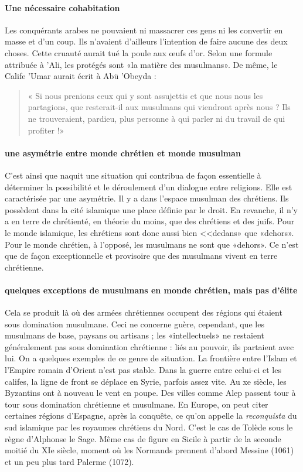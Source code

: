 \paragraph{Une nécessaire cohabitation}Les conquérants arabes ne pouvaient ni massacrer ces gens ni les convertir en masse et d'un coup. Ils n'avaient d'ailleurs l'intention de faire aucune des deux choses. Cette cruauté aurait tué la poule aux œufs d'or. Selon une formule attribuée à 'Ali, les protégés sont «la matière des musulmans». De même, le Calife 'Umar aurait écrit à Abü 'Obeyda : \begin{quote}
    « Si nous prenions ceux qui y sont assujettis et que nous nous les partagions, que resterait-il aux musulmans qui viendront après nous ? Ils ne trouveraient, pardieu, plus personne à qui parler ni du travail de qui profiter !»
\end{quote} 

\paragraph{une asymétrie entre monde chrétien et monde musulman}
C'est ainsi que naquit une situation qui contribua de façon essentielle à déterminer la possibilité et le déroulement d'un dialogue entre religions. Elle est caractérisée par une asymétrie. Il y a dans l'espace musulman des chrétiens. Ils possèdent dans la cité islamique une place définie par le droit. En revanche, il n'y a en
terre de chrétienté, en théorie du moins, que des chrétiens et des juifs. Pour le monde islamique, les chrétiens sont donc aussi bien
<<dedans» que «dehors». Pour le monde chrétien, à l'opposé, les musulmans ne sont que «dehors». Ce n'est que de façon exceptionnelle et provisoire que des musulmans vivent en terre chrétienne.

\paragraph{quelques exceptions de musulmans en monde chrétien, mais pas d'élite}
Cela se produit là où des armées chrétiennes occupent des régions qui étaient sous domination musulmane. Ceci ne concerne guère, cependant, que les musulmans de base, paysans ou artisans ; les «intellectuels» ne restaient généralement pas sous domination chrétienne : liés au pouvoir, ils partaient avec lui. On a quelques exemples de ce genre de situation. La frontière entre l'Islam et l'Empire romain d'Orient n'est pas stable. Dans la guerre entre celui-ci et les califes, la ligne de front se déplace en Syrie, parfois assez vite. Au xe siècle, les Byzantins ont à nouveau le vent en poupe. Des villes comme Alep passent tour à tour sous domination chrétienne et musulmane. En Europe, on peut citer certaines régions d'Espagne, après la conquête, ce qu'on appelle la \textit{reconquista} du sud islamique par les royaumes chrétiens du Nord. C'est le cas de Tolède sous le règne d'Alphonse le Sage. Même cas de figure en Sicile à partir de la seconde moitié du XIe siècle, moment où les Normands prennent d'abord Messine (1061) et un peu plus tard Palerme (1072).
